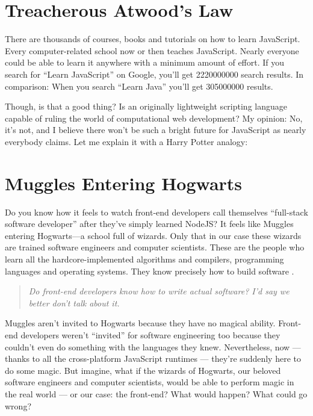 \documentclass[10pt]{article}
\begin{document}
\begin{sloppypar}
  \section{Treacherous Atwood’s Law}
  \label{sec:atwood-law}

  There are thousands of courses, books and tutorials on how to learn JavaScript. Every computer-related school now or then teaches JavaScript. Nearly everyone could be able to learn it anywhere with a minimum amount of effort. If you search for “Learn JavaScript” on Google, you’ll get \num{2220000000} search results. In comparison: When you search “Learn Java” you’ll get \num{305000000} results.

  Though, is that a good thing? Is an originally lightweight scripting language capable of ruling the world of computational web development? My opinion: No, it’s not, and I believe there won’t be such a bright future for JavaScript as nearly everybody claims. Let me explain it with a Harry Potter analogy:

  \section{Muggles Entering Hogwarts}
  \label{sec:muggles}

  Do you know how it feels to watch front-end developers call themselves “full-stack software developer” after they’ve simply learned NodeJS? It feels like Muggles entering Hogwarts—a school full of wizards. Only that in our case these wizards are trained software engineers and computer scientists. These are the people who learn all the hardcore-implemented algorithms and compilers, programming languages and operating systems. They know precisely how to build software \citep{might_what_2011}.

  \begin{quote}
    \emph{Do front-end developers know how to write actual software? I’d say we better don’t talk about it.}
  \end{quote}

  Muggles aren’t invited to Hogwarts because they have no magical ability. Front-end developers weren’t “invited” for software engineering too because they couldn’t even do something with the languages they knew. Nevertheless, now — thanks to all the cross-platform JavaScript runtimes — they’re suddenly here to do some magic. But imagine, what if the wizards of Hogwarts, our beloved software engineers and computer scientists, would be able to perform magic in the real world — or our case: the front-end? What would happen? What could go wrong?


\end{sloppypar}
\end{document}
